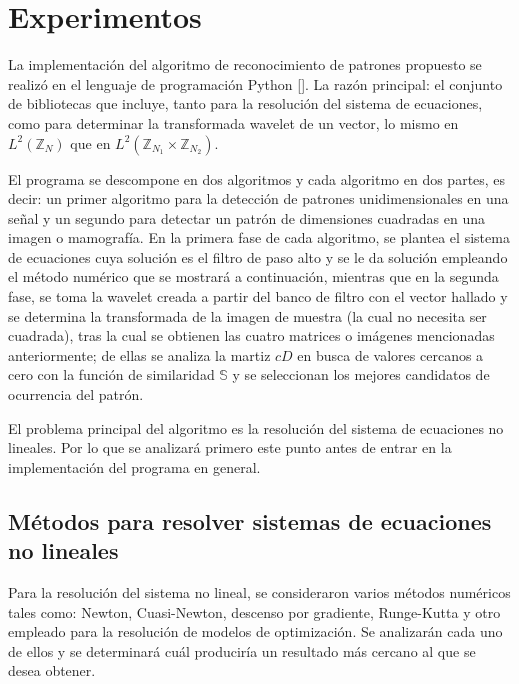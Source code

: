 \chapter{Experimentos}\label{chapter:implementation}

\par La implementaci\'on del algoritmo de reconocimiento de patrones propuesto se realiz\'o en el lenguaje de programaci\'on Python [\cite{22}]. La raz\'on principal: el conjunto de bibliotecas que incluye, tanto para la resoluci\'on del sistema de ecuaciones, como para determinar la transformada wavelet de un vector, lo mismo en $L^2(\mathbb{Z}_N)$ que en $L^2(\mathbb{Z}_{N_1}\times\mathbb{Z}_{N_2})$.

\par El programa se descompone en dos algoritmos y cada algoritmo en dos partes, es decir: un primer algoritmo para la detecci\'on de patrones unidimensionales en una se\~nal y un segundo para detectar un patr\'on de dimensiones cuadradas en una imagen o mamograf\'ia. En la primera fase de cada algoritmo, se plantea el sistema de ecuaciones cuya soluci\'on es el filtro de paso alto y se le da soluci\'on empleando el m\'etodo num\'erico que se mostrar\'a a continuaci\'on, mientras que en la segunda fase, se toma la wavelet creada a partir del banco de filtro con el vector hallado y se determina la transformada de la imagen de muestra (la cual no necesita ser cuadrada), tras la cual se obtienen las cuatro matrices o im\'agenes mencionadas anteriormente; de ellas se analiza la martiz $cD$ en busca de valores cercanos a cero con la funci\'on de similaridad $\mathbb{S}$ y se seleccionan los mejores candidatos de ocurrencia del patr\'on.\\

\par El problema principal del algoritmo es la resoluci\'on del sistema de ecuaciones no lineales. Por lo que se analizar\'a primero este punto antes de entrar en la implementaci\'on del programa en general.\\

\section{M\'etodos para resolver sistemas de ecuaciones no lineales}

\par Para la resoluci\'on del sistema no lineal, se consideraron varios m\'etodos num\'ericos tales como: Newton, Cuasi-Newton, descenso por gradiente, Runge-Kutta y otro empleado para la resoluci\'on de modelos de optimizaci\'on. Se analizar\'an cada uno de ellos y se determinar\'a cu\'al producir\'ia un resultado m\'as cercano al que se desea obtener.

